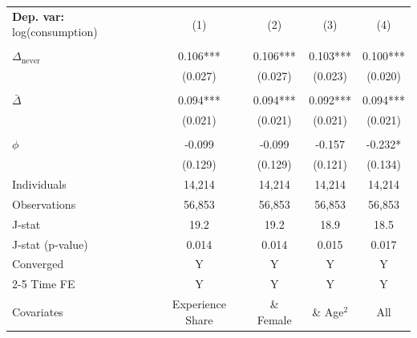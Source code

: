 \begin{tabular}{l cccc} \toprule  \textbf{Dep. var:}  log(consumption) 
                    &\multicolumn{1}{c}{(1)}   &\multicolumn{1}{c}{(2)}   &\multicolumn{1}{c}{(3)}   &\multicolumn{1}{c}{(4)}   \\
                    &               &               &               &               \\
\addlinespace
$\Delta_{\text{never}}$&       0.106***&       0.106***&       0.103***&       0.100***\\
                    &     (0.027)   &     (0.027)   &     (0.023)   &     (0.020)   \\
                    &               &               &               &               \\
\addlinespace
$\bar{\Delta}$      &       0.094***&       0.094***&       0.092***&       0.094***\\
                    &     (0.021)   &     (0.021)   &     (0.021)   &     (0.021)   \\
                    &               &               &               &               \\
\addlinespace
$\phi$              &      -0.099   &      -0.099   &      -0.157   &      -0.232*  \\
                    &     (0.129)   &     (0.129)   &     (0.121)   &     (0.134)   \\
\addlinespace
Individuals         &      14,214   &      14,214   &      14,214   &      14,214   \\
Observations        &      56,853   &      56,853   &      56,853   &      56,853   \\
J-stat              &        19.2   &        19.2   &        18.9   &        18.5   \\
J-stat (p-value)    &       0.014   &       0.014   &       0.015   &       0.017   \\
Converged           &           Y   &           Y   &           Y   &           Y   \\
\cmidrule{2-5} Time FE & Y & Y & Y & Y \\ Covariates & Experience Share & \& Female & \& Age$^2$ & All \\ \bottomrule \end{tabular}
